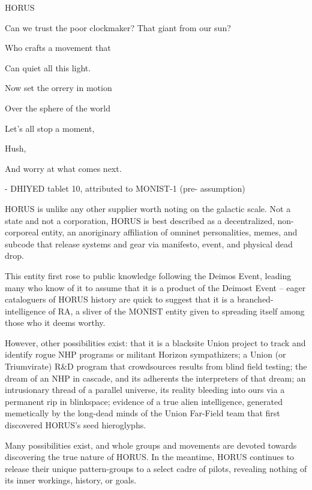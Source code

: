 HORUS

                                     Can we trust the poor clockmaker? That giant from our
                                    sun?

                                     Who crafts a movement that

                                     Can quiet all this light.

                                    Now set the orrery in motion

                                     Over the sphere of the world

                                    Let’s all stop a moment,

                                    Hush,

                                    And worry at what comes next.

                                         -    DHIYED tablet 10, attributed to MONIST-1 (pre-
                                              assumption)

HORUS is unlike any other supplier worth noting on the galactic scale. Not a state and not a
corporation, HORUS is best described as a decentralized, non-corporeal entity, an anoriginary
affiliation of omninet personalities, memes, and subcode that release systems and gear via
manifesto, event, and physical dead drop.

This entity first rose to public knowledge following the Deimos Event, leading many who know of it
to assume that it is a product of the Deimost Event -- eager cataloguers of HORUS history are
quick to suggest that it is a branched-intelligence of RA, a sliver of the MONIST entity given to
spreading itself among those who it deems worthy.

However, other possibilities exist: that it is a blacksite Union project to track and identify rogue
NHP programs or militant Horizon sympathizers; a Union (or Triumvirate) R\&D program that
crowdsources results from blind field testing; the dream of an NHP in cascade, and its adherents
the interpreters of that dream; an intrusionary thread of a parallel universe, its reality bleeding into
ours via a permanent rip in blinkspace; evidence of a true alien intelligence, generated
memetically by the long-dead minds of the Union Far-Field team that first discovered HORUS’s
seed hieroglyphs.

Many possibilities exist, and whole groups and movements are devoted towards discovering the
true nature of HORUS. In the meantime, HORUS continues to release their unique pattern-groups
to a select cadre of pilots, revealing nothing of its inner workings, history, or goals.

